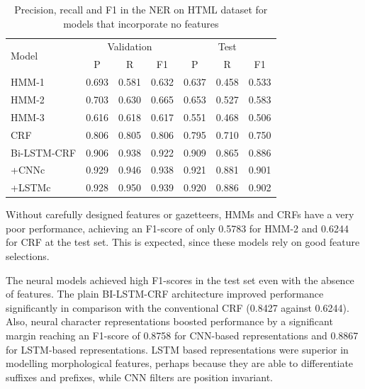 \documentclass{nle}
\begin{document}
\begin{table}[h]
  \small
  \begin{center}
    \begin{tabular}{ lllllll }
      \toprule
      \multirow{2}{*}{Model} & \multicolumn{3}{c}{Validation} & \multicolumn{3}{c}{Test} \\
                             & \multicolumn{1}{c}{P} & \multicolumn{1}{c}{R} & \multicolumn{1}{c}{F1}
                             & \multicolumn{1}{c}{P} & \multicolumn{1}{c}{R} & \multicolumn{1}{c}{F1} \\
      \midrule
      HMM-1                 & 0.693 & 0.581 & 0.632 & 0.637 & 0.458 & 0.533 \\
      HMM-2                 & 0.703 & 0.630 & 0.665 & 0.653 & 0.527 & 0.583 \\
      HMM-3                 & 0.616 & 0.618 & 0.617 & 0.551 & 0.468 & 0.506 \\
      CRF                   & 0.806 & 0.805 & 0.806 & 0.795 & 0.710 & 0.750 \\
      Bi-LSTM-CRF           & 0.906 & 0.938 & 0.922 & 0.909 & 0.865 & 0.886 \\
      +CNNc                 & 0.929 & 0.946 & 0.938 & 0.921 & 0.881 & 0.901 \\
      +LSTMc                & 0.928 & 0.950 & 0.939 & 0.920 & 0.886 & 0.902 \\
      \bottomrule
    \end{tabular}
  \end{center}
  \caption{Precision, recall and F1 in the NER on HTML dataset for models that incorporate no features}
  \label{tab:experiment1}
\end{table}

Without carefully designed features or gazetteers, HMMs and CRFs have a very 
poor performance, achieving an F1-score of only 0.5783 for HMM-2 and 0.6244 for CRF
at the test set. This is expected, since these models rely on good feature selections.

The neural models achieved high F1-scores in the test
set even with the absence of features. The plain BI-LSTM-CRF architecture improved performance 
significantly in comparison with the conventional CRF (0.8427 against 0.6244). 
Also, neural character representations boosted performance by a significant margin
reaching an F1-score of 0.8758 for CNN-based representations and 0.8867 for LSTM-based
representations. LSTM based representations were superior in modelling
morphological features, perhaps because they are able to differentiate suffixes 
and prefixes, while CNN filters are position invariant. 
\end{document}
